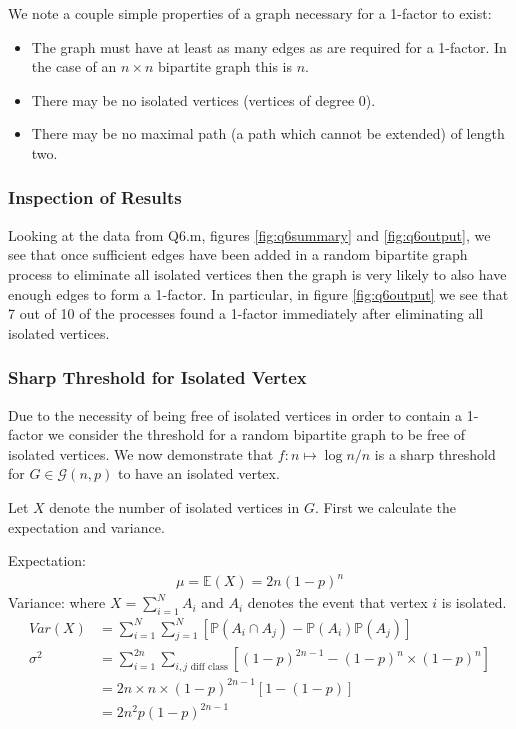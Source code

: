 \documentclass[a4paper]{article}
\begin{document}
\bigskip
We note a couple simple properties of a graph necessary for a 1-factor to exist:
\begin{itemize}
    \item
    The graph must have at least as many edges as are required for a 1-factor. In the case of an $n\times n$ bipartite graph this is $n$.
    \item
    There may be no isolated vertices (vertices of degree 0).
    \item
    There may be no maximal path (a path which cannot be extended) of length two. 
\end{itemize}

\subsubsection*{Inspection of Results}

Looking at the data from Q6.m, figures \ref{fig:q6summary} and \ref{fig:q6output}, we see that once sufficient edges have been added in a random bipartite graph process to eliminate all isolated vertices then the graph is very likely to also have enough edges to form a 1-factor. In particular, in figure \ref{fig:q6output} we see that 7 out of 10 of the processes found a 1-factor immediately after eliminating all isolated vertices.

\subsubsection*{Sharp Threshold for Isolated Vertex}
Due to the necessity of being free of isolated vertices in order to contain a 1-factor we consider the threshold for a random bipartite graph to be free of isolated vertices. We now demonstrate that $f: n \mapsto \log{n}/n$ is a sharp threshold for $G \in \mathcal{G}(n,p)$ to have an isolated vertex.

\bigskip
Let $X$ denote the number of isolated vertices in $G$. First we calculate the expectation and variance.

\bigskip
Expectation:
\begin{align*}
    \mu = \mathbb{E}(X) = 2n(1-p)^{n}
\end{align*}
Variance: where $X = \sum_{i=1}^N A_i$ and $A_i$ denotes the event that vertex $i$ is isolated.
\begin{align*}
    Var(X) &= \sum_{i=1}^N \sum_{j=1}^N [\mathbb{P}(A_i \cap A_j) - \mathbb{P}(A_i)\mathbb{P}(A_j)] \\
    \sigma^2 &= \sum_{i=1}^{2n} \sum_{i,j \text{ diff class}} [(1-p)^{2n-1} - (1-p)^n\times(1-p)^n] \\
             &= 2n \times n \times (1-p)^{2n-1}[1 - (1-p)] \\
             &= 2n^2p(1-p)^{2n-1}
\end{align*}
\end{document}
